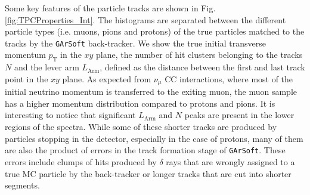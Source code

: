 Some key features of the particle tracks are shown in Fig. \ref{fig:TPCProperties_Int}. The histograms are separated between the different particle types (i.e. muons, pions and protons) of the true particles matched to the tracks by the \texttt{GArSoft} back-tracker. We show the true initial transverse momentum $p_\text{T}$ in the $xy$ plane, the number of hit clusters belonging to the tracks $N$ and the lever arm $L_\textrm{Arm}$, defined as the distance between the first and last track point in the $xy$ plane. As expected from $\nu_\mu$ CC interactions, where most of the initial neutrino momentum is transferred to the exiting muon, the muon sample has a higher momentum distribution compared to protons and pions. It is interesting to notice that significant $L_\text{Arm}$ and $N$ peaks are present in the lower regions of the spectra. While some of these shorter tracks are produced by particles stopping in the detector, especially in the case of protons, many of them are also the product of errors in the track formation stage of \texttt{GArSoft}. These errors include clumps of hits produced by $\delta$ rays that are wrongly assigned to a true MC particle by the back-tracker or longer tracks that are cut into shorter segments.

